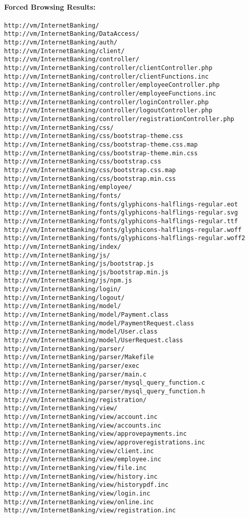 \paragraph{Forced Browsing Results:}
\begin{verbatim}
http://vm/InternetBanking/
http://vm/InternetBanking/DataAccess/
http://vm/InternetBanking/auth/
http://vm/InternetBanking/client/
http://vm/InternetBanking/controller/
http://vm/InternetBanking/controller/clientController.php
http://vm/InternetBanking/controller/clientFunctions.inc
http://vm/InternetBanking/controller/employeeController.php
http://vm/InternetBanking/controller/employeeFunctions.inc
http://vm/InternetBanking/controller/loginController.php
http://vm/InternetBanking/controller/logoutController.php
http://vm/InternetBanking/controller/registrationController.php
http://vm/InternetBanking/css/
http://vm/InternetBanking/css/bootstrap-theme.css
http://vm/InternetBanking/css/bootstrap-theme.css.map
http://vm/InternetBanking/css/bootstrap-theme.min.css
http://vm/InternetBanking/css/bootstrap.css
http://vm/InternetBanking/css/bootstrap.css.map
http://vm/InternetBanking/css/bootstrap.min.css
http://vm/InternetBanking/employee/
http://vm/InternetBanking/fonts/
http://vm/InternetBanking/fonts/glyphicons-halflings-regular.eot
http://vm/InternetBanking/fonts/glyphicons-halflings-regular.svg
http://vm/InternetBanking/fonts/glyphicons-halflings-regular.ttf
http://vm/InternetBanking/fonts/glyphicons-halflings-regular.woff
http://vm/InternetBanking/fonts/glyphicons-halflings-regular.woff2
http://vm/InternetBanking/index/
http://vm/InternetBanking/js/
http://vm/InternetBanking/js/bootstrap.js
http://vm/InternetBanking/js/bootstrap.min.js
http://vm/InternetBanking/js/npm.js
http://vm/InternetBanking/login/
http://vm/InternetBanking/logout/
http://vm/InternetBanking/model/
http://vm/InternetBanking/model/Payment.class
http://vm/InternetBanking/model/PaymentRequest.class
http://vm/InternetBanking/model/User.class
http://vm/InternetBanking/model/UserRequest.class
http://vm/InternetBanking/parser/
http://vm/InternetBanking/parser/Makefile
http://vm/InternetBanking/parser/exec
http://vm/InternetBanking/parser/main.c
http://vm/InternetBanking/parser/mysql_query_function.c
http://vm/InternetBanking/parser/mysql_query_function.h
http://vm/InternetBanking/registration/
http://vm/InternetBanking/view/
http://vm/InternetBanking/view/account.inc
http://vm/InternetBanking/view/accounts.inc
http://vm/InternetBanking/view/approvepayments.inc
http://vm/InternetBanking/view/approveregistrations.inc
http://vm/InternetBanking/view/client.inc
http://vm/InternetBanking/view/employee.inc
http://vm/InternetBanking/view/file.inc
http://vm/InternetBanking/view/history.inc
http://vm/InternetBanking/view/historypdf.inc
http://vm/InternetBanking/view/login.inc
http://vm/InternetBanking/view/online.inc
http://vm/InternetBanking/view/registration.inc
\end{verbatim}

